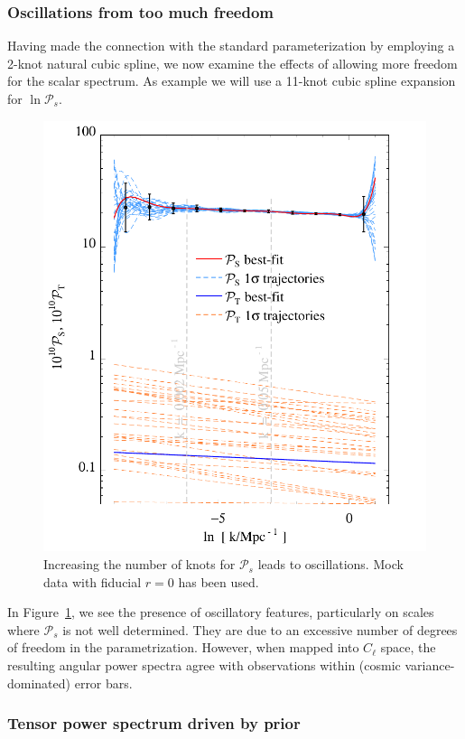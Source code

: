 \documentclass[a4paper,11pt]{article}
\newcommand{\pscalar}{{\mathcal{P}_s}}
\begin{document}
\subsubsection{Oscillations from too much freedom}

Having made the connection with the standard parameterization by
employing a 2-knot natural cubic spline, we now examine the effects of
allowing more freedom for the scalar spectrum. As example we will use
a 11-knot cubic spline expansion for $\ln \pscalar$.
\begin{figure}
  \includegraphics[width=0.9\linewidth]{fc_p11cubicspline_traj11} 
  \caption{Increasing the number of knots for $\pscalar$ leads to
  oscillations. Mock data with fiducial $r=0$ has been used.}
 \label{fig:11knot_Ps_Pt}
\end{figure}
In Figure~\ref{fig:11knot_Ps_Pt}, we see the presence of oscillatory
features, particularly on scales where $\pscalar$ is not well
determined.  They are due to an excessive number of degrees of freedom
in the parametrization.  However, when mapped into $C_\ell$ space, the
resulting angular power spectra agree with observations within (cosmic
variance-dominated) error bars.

\subsubsection{Tensor power spectrum driven by prior}
\end{document}
